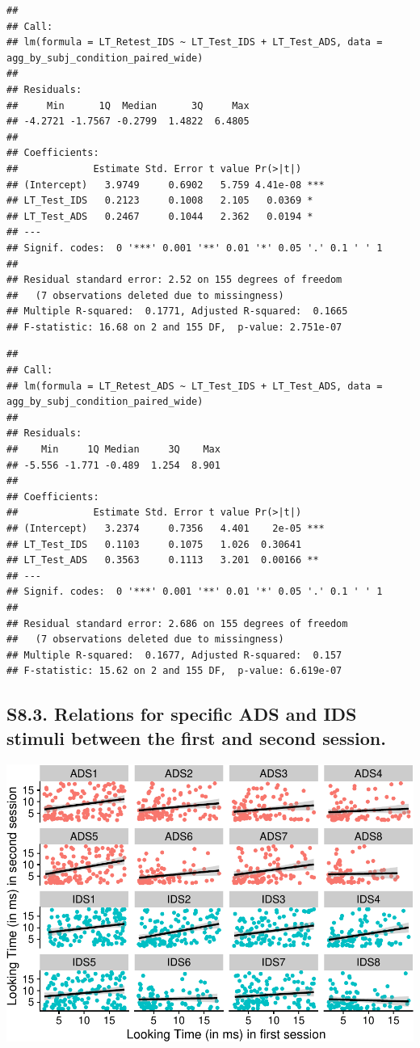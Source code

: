 \documentclass[
  man, donotrepeattitle,floatsintext]{apa6}
\begin{document}
\begin{verbatim}
## 
## Call:
## lm(formula = LT_Retest_IDS ~ LT_Test_IDS + LT_Test_ADS, data = agg_by_subj_condition_paired_wide)
## 
## Residuals:
##     Min      1Q  Median      3Q     Max 
## -4.2721 -1.7567 -0.2799  1.4822  6.4805 
## 
## Coefficients:
##             Estimate Std. Error t value Pr(>|t|)    
## (Intercept)   3.9749     0.6902   5.759 4.41e-08 ***
## LT_Test_IDS   0.2123     0.1008   2.105   0.0369 *  
## LT_Test_ADS   0.2467     0.1044   2.362   0.0194 *  
## ---
## Signif. codes:  0 '***' 0.001 '**' 0.01 '*' 0.05 '.' 0.1 ' ' 1
## 
## Residual standard error: 2.52 on 155 degrees of freedom
##   (7 observations deleted due to missingness)
## Multiple R-squared:  0.1771, Adjusted R-squared:  0.1665 
## F-statistic: 16.68 on 2 and 155 DF,  p-value: 2.751e-07
\end{verbatim}

\begin{verbatim}
## 
## Call:
## lm(formula = LT_Retest_ADS ~ LT_Test_IDS + LT_Test_ADS, data = agg_by_subj_condition_paired_wide)
## 
## Residuals:
##    Min     1Q Median     3Q    Max 
## -5.556 -1.771 -0.489  1.254  8.901 
## 
## Coefficients:
##             Estimate Std. Error t value Pr(>|t|)    
## (Intercept)   3.2374     0.7356   4.401    2e-05 ***
## LT_Test_IDS   0.1103     0.1075   1.026  0.30641    
## LT_Test_ADS   0.3563     0.1113   3.201  0.00166 ** 
## ---
## Signif. codes:  0 '***' 0.001 '**' 0.01 '*' 0.05 '.' 0.1 ' ' 1
## 
## Residual standard error: 2.686 on 155 degrees of freedom
##   (7 observations deleted due to missingness)
## Multiple R-squared:  0.1677, Adjusted R-squared:  0.157 
## F-statistic: 15.62 on 2 and 155 DF,  p-value: 6.619e-07
\end{verbatim}

\hypertarget{s8.3.-relations-for-specific-ads-and-ids-stimuli-between-the-first-and-second-session.}{%
\subsection{S8.3. Relations for specific ADS and IDS stimuli between the first and second session.}\label{s8.3.-relations-for-specific-ads-and-ids-stimuli-between-the-first-and-second-session.}}

\includegraphics{MB1T_supplement_files/figure-latex/unnamed-chunk-19-1.pdf}
\end{document}
